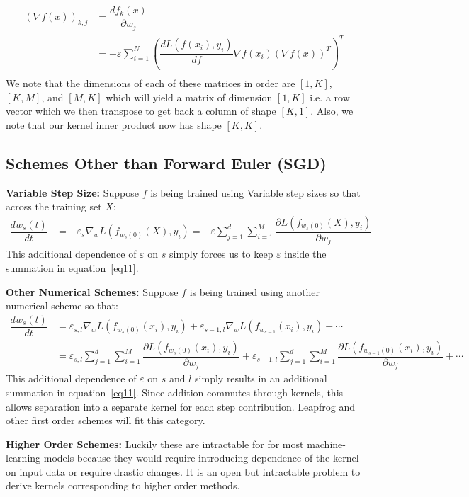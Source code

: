 \begin{align}
    (\nabla f(x))_{k,j} &= \dfrac{d f_{k}(x)}{\partial w_j}\\
    &= -\varepsilon \sum_{i=1}^N \left(\dfrac{d L(f(x_i), y_i)}{d f} 
     \nabla f(x_i) (\nabla f(x))^T\right)^T\\    
\end{align}
We note that the dimensions of each of these matrices in order are $[1,K]$, $[K,M]$, and $[M,K]$ which will yield a matrix of dimension $[1, K]$ i.e. a row vector which we then transpose to get back a column of shape $[K, 1]$. Also, we note that our kernel inner product now has shape $[K,K]$. 

\subsection{Schemes Other than Forward Euler (SGD)}

\textbf{Variable Step Size:}
Suppose $f$ is being trained using Variable step sizes so that across the training set $X$:
\begin{align}
    \dfrac{d w_s(t)}{dt} &= -\varepsilon_s \nabla_w L(f_{w_s(0)}(X), y_i) = -\varepsilon \sum_{j = 1}^{d} \sum_{i=1}^M  \dfrac{\partial L(f_{w_s(0)}(X),  y_i)}{\partial w_j} \label{eq10}
\end{align}
This additional dependence of $\varepsilon$ on $s$ simply forces us to keep $\varepsilon$ inside the summation in equation~\ref{eq11}. 

\textbf{Other  Numerical Schemes:} Suppose $f$ is being trained using another numerical scheme so that:
\begin{align}
    \dfrac{d w_s(t)}{dt} &= \varepsilon_{s,l} \nabla_w L(f_{w_s(0)}(x_i), y_i) + \varepsilon_{s-1, l}\nabla_w L(f_{w_{s-1}}(x_i), y_i) + \cdots \\
    &= \varepsilon_{s,l} \sum_{j = 1}^{d} \sum_{i=1}^M  \dfrac{\partial L(f_{w_s(0)}(x_i),  y_i)}{\partial w_j} + \varepsilon_{s-1, l} \sum_{j = 1}^{d} \sum_{i=1}^M  \dfrac{\partial L(f_{w_{s-1}(0)}(x_i),  y_i)}{\partial w_j} + \cdots
\end{align}
This additional dependence of $\varepsilon$ on $s$ and $l$ simply results in an additional summation in equation~\ref{eq11}. Since addition commutes through kernels, this allows separation into a separate kernel for each step contribution. Leapfrog and other first order schemes will fit this category. 

\textbf{Higher Order Schemes:} Luckily these are intractable for for most machine-learning models because they would require introducing dependence of the kernel on input data or require drastic changes. It is an open but intractable problem to derive kernels corresponding to higher order methods. 


